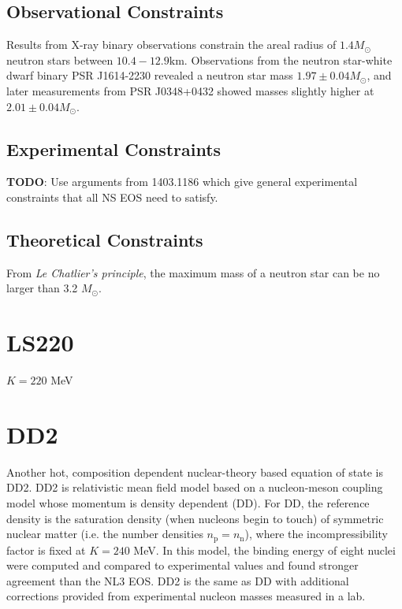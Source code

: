 \subsection{Observational Constraints}

Results from X-ray binary observations constrain the areal radius of $1.4M_\odot$ neutron stars between $10.4 - 12.9 \textrm{km}$.
Observations from the neutron star-white dwarf binary PSR J1614-2230 revealed a neutron star mass $1.97 \pm 0.04 M_\odot$, and later measurements from PSR J0348+0432 showed masses slightly higher at  $2.01 \pm 0.04 M_\odot$.

\subsection{Experimental Constraints}

\textbf{TODO}: Use arguments from 1403.1186 which give general experimental constraints that all NS EOS need to satisfy. 

\subsection{Theoretical Constraints}

From \textit{Le Chatlier's principle}, the maximum mass of a neutron star can be no larger than 3.2 $M_\odot$.

\section{LS220}
\label{sec:ls220}

$K = 220$ MeV

\section{DD2}
\label{sec:dd2}

Another hot, composition dependent nuclear-theory based equation of state is DD2.  DD2 is relativistic mean field model based on a nucleon-meson coupling model whose momentum is density dependent (DD).  
For DD, the reference density is the saturation density (when nucleons begin to touch) of symmetric nuclear matter (i.e. the number densities $n_\textrm{p} = n_\textrm{n}$), where the incompressibility factor is fixed at $K = 240$ MeV.
In this model, the binding energy of eight nuclei were computed and compared to experimental values and found stronger agreement than the NL3 EOS.
DD2 is the same as DD with additional corrections provided from experimental nucleon masses measured in a lab.

